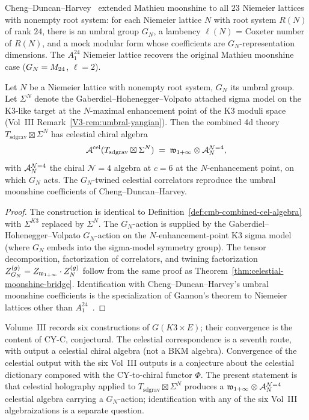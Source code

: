 Cheng--Duncan--Harvey~\cite{ChengDuncanHarvey1,ChengDuncanHarvey2}
extended Mathieu moonshine to all $23$ Niemeier lattices with nonempty
root system: for each Niemeier lattice $N$ with root system $R(N)$ of
rank $24$, there is an umbral group $G_N$, a lambency $\ell(N)$ = Coxeter
number of $R(N)$, and a mock modular form whose coefficients are
$G_N$-representation dimensions. The $A_1^{24}$ Niemeier lattice
recovers the original Mathieu moonshine case ($G_N = M_{24}$,
$\ell = 2$).

\begin{proposition}
\label{prop:umbral-celestial-correspondence}
Let $N$ be a Niemeier lattice with nonempty root system, $G_N$ its
umbral group. Let $\Sigma^N$ denote the Gaberdiel--Hohenegger--Volpato
attached sigma model on the K3-like target at the $N$-maximal
enhancement point of the K3 moduli space (Vol~III
Remark~\ref{V3-rem:umbral-yangian}). Then the combined 4d theory
$T_{\mathrm{sd grav}} \boxtimes \Sigma^N$ has celestial chiral algebra
\[
\mathcal A^{\mathrm{cel}}(T_{\mathrm{sd grav}} \boxtimes \Sigma^N)
\;=\;
\mathfrak w_{1+\infty} \otimes \mathcal A^{\mathcal{N}{=}4}_{N},
\]
with $\mathcal A^{\mathcal{N}{=}4}_{N}$ the chiral $\mathcal{N}{=}4$ algebra at
$c = 6$ at the $N$-enhancement point, on which $G_N$ acts. The
$G_N$-twined celestial correlators reproduce the umbral moonshine
coefficients of Cheng--Duncan--Harvey.
\end{proposition}

\begin{proof}
The construction is identical to
Definition~\ref{def:cmb-combined-cel-algebra} with $\Sigma^{K3}$
replaced by $\Sigma^N$. The $G_N$-action is supplied by the
Gaberdiel--Hohenegger--Volpato $G_N$-action on the
$N$-enhancement-point K3 sigma model (where $G_N$ embeds into the
sigma-model symmetry group). The tensor decomposition,
factorization of correlators, and twining factorization
$Z_{G_N}^{(g)} = Z_{\mathfrak w_{1+\infty}} \cdot Z_N^{(g)}$ follow from the same proof
as Theorem~\ref{thm:celestial-moonshine-bridge}. Identification with
Cheng--Duncan--Harvey's umbral moonshine coefficients is the
specialization of Gannon's theorem to Niemeier lattices other than
$A_1^{24}$~\cite{ChengDuncanHarvey2}.
\end{proof}

\begin{remark}
\label{rem:cmb-six-routes-one-output}
Volume~III records six constructions of $G(K3 \times E)$;
their convergence is the content of CY-C, conjectural. The
celestial correspondence is a seventh route,
with output a celestial chiral algebra (not a BKM algebra).
Convergence of the celestial output with the six Vol~III outputs is
a conjecture about the celestial dictionary composed with the CY-to-chiral
functor $\Phi$. The present statement is that celestial holography
applied to $T_{\mathrm{sd grav}} \boxtimes \Sigma^N$
produces a $\mathfrak w_{1+\infty} \otimes \mathcal A^{\mathcal{N}{=}4}_{N}$ celestial algebra
carrying a $G_N$-action; identification with any of the six Vol~III
algebraizations is a separate question.
\end{remark}

